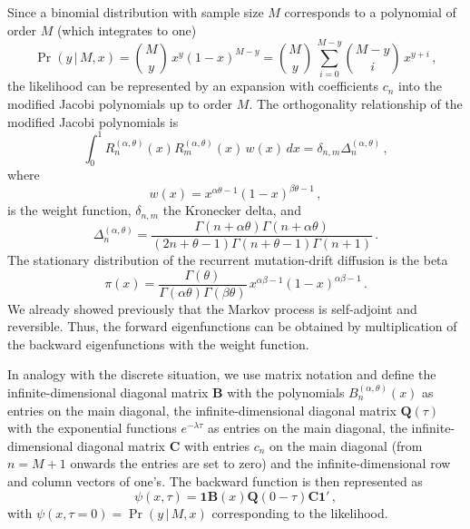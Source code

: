 \documentclass[preprint]{elsarticle}
\newcommand\given{{\,|\,}}
\newcommand\oneC{\ensuremath{\mathbf{1}'}}
\newcommand\oneR{\ensuremath{\mathbf{1}}}
\begin{document}
Since a binomial distribution with sample size $M$ corresponds to a polynomial of order $M$ (which integrates to one) 
\begin{equation}
\Pr(y\given M,x)=\binom{M}{y}\,x^{y}(1-x)^{M-y}
=\binom{M}{y}\,\sum_{i=0}^{M-y} \binom{M-y}{i}\,x^{y+i}\,,
\end{equation}
the likelihood can be represented by an expansion with coefficients $c_n$ into the modified Jacobi polynomials up to order $M$. The orthogonality relationship of the modified Jacobi polynomials is
\begin{equation}\label{eq:ortho_Jacobi}
    \int_0^1 R_n^{(\alpha,\theta)}(x) R_m^{(\alpha,\theta)}(x)\, w(x)\,dx=\delta_{n,m} \Delta_n^{(\alpha,\theta)}\,,
\end{equation}
where
\begin{equation}
w(x)=x^{\alpha\theta-1}(1-x)^{\beta\theta-1}\,,
\end{equation}
is the weight function, $\delta_{n,m}$ the Kronecker delta, and 
\begin{equation}
    \Delta_n^{(\alpha,\theta)}=\frac{\Gamma(n+\alpha\theta)\Gamma(n+\alpha\theta)}{(2n+\theta-1)\Gamma(n+\theta-1)\Gamma(n+1)}\,.
\end{equation}
The stationary distribution of the recurrent mutation-drift diffusion is the beta
\begin{equation}
  \pi(x)=\frac{\Gamma(\theta)}{\Gamma(\alpha\theta)\Gamma(\beta\theta)}\, x^{\alpha\beta-1}(1-x)^{\alpha\beta-1}\,.
\end{equation}
We already showed previously that the Markov process is self-adjoint and reversible. Thus, the forward eigenfunctions can be obtained by multiplication of the backward eigenfunctions with the weight function. 

In analogy with the discrete situation, we use matrix notation and define the infinite-dimensional diagonal matrix $\mathbf{B}$ with the polynomials $B_n^{(\alpha,\theta)}(x)$ as entries on the main diagonal, the infinite-dimensional diagonal matrix $\mathbf{Q}(\tau)$ with the exponential functions $e^{-\lambda\tau}$ as entries on the main diagonal, the infinite-dimensional diagonal matrix $\mathbf{C}$ with entries $c_n$ on the main diagonal (from $n=M+1$ onwards the entries are set to zero) and the infinite-dimensional row and column vectors of one's. The backward function is then represented as
\begin{equation}
\psi(x,\tau)=\oneR\mathbf{B}(x)\mathbf{Q}(0-\tau)\mathbf{C}\oneC\,,
\end{equation}
with $\psi(x,\tau=0)=\Pr(y\given M,x)$ corresponding to the likelihood.
\end{document}
